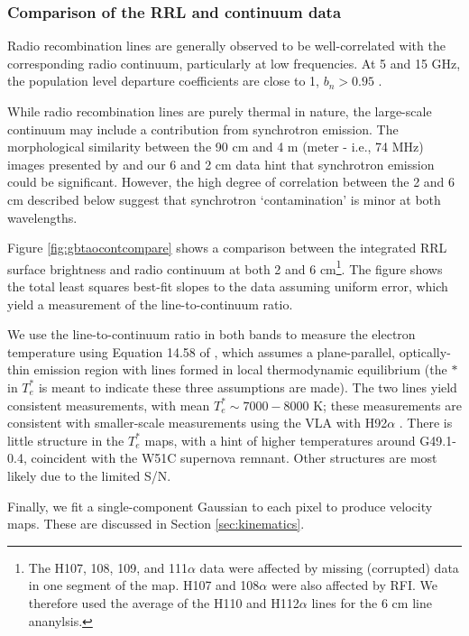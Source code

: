 \subsubsection{Comparison of the RRL and continuum data}
\label{sec:rrlvscont}
Radio recombination lines are generally observed to be well-correlated with the
corresponding radio continuum, particularly at low frequencies.  At 5 and 15
GHz, the population level departure coefficients are close to 1, $b_n > 0.95$
\citep{Wilson2009a,Walmsley1990a}.

While radio recombination lines are purely thermal in nature, the large-scale
continuum may include a contribution from synchrotron emission.  The
morphological similarity between the 90 cm and 4 m (meter - i.e., 74 MHz)
images presented by \citet{Brogan2013a} and our 6 and 2 cm data hint that
synchrotron emission could be significant.  However, the high degree of
correlation between the 2 and 6 cm described below suggest that synchrotron
`contamination' is minor at both wavelengths.

Figure \ref{fig:gbtaocontcompare} shows a comparison between the integrated RRL
surface brightness and radio continuum at both 2 and 6 cm\footnote{The H107,
108, 109, and 111$\alpha$ data were affected by missing (corrupted) data in one
segment of the map.  H107 and 108$\alpha$ were also affected by RFI.  We
therefore used the average of the H110 and H112$\alpha$ lines for the 6 cm line
ananylsis.}.  The figure shows
the total least squares best-fit slopes to the data assuming uniform error,
which yield a measurement of the line-to-continuum ratio.

We use the line-to-continuum ratio in both bands to measure the electron
temperature using Equation 14.58 of \citet{Wilson2009a}, which assumes a
plane-parallel, optically-thin emission region with lines formed in local
thermodynamic equilibrium (the $*$ in $T_e^*$ is meant to indicate these three
assumptions are made).  The two lines yield consistent measurements, with mean
$T_e^*\sim7000-8000$ K; these measurements are consistent with smaller-scale
measurements using the VLA with H92$\alpha$ \citep{Mehringer1994a}.  There is
little structure in the $T_e^*$ maps, with a hint of higher temperatures
around G49.1-0.4, coincident with the W51C supernova remnant.  Other structures
are most likely due to the limited S/N.

Finally, we fit a single-component Gaussian to each pixel to produce velocity
maps.  These are discussed in Section \ref{sec:kinematics}.

